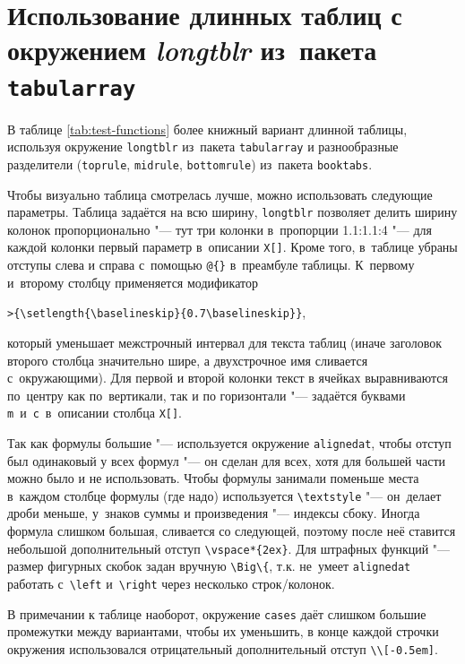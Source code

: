 \section{Использование длинных таблиц с окружением \textit{longtblr} из~пакета \texttt{tabularray}}\label{app:B2a}

В таблице \cref{tab:test-functions} более книжный вариант длинной таблицы,
используя окружение \verb!longtblr! из~пакета \verb!tabularray! и разнообразные
разделители (\verb!toprule!, \verb!midrule!, \verb!bottomrule!) из~пакета
\verb!booktabs!.

Чтобы визуально таблица смотрелась лучше, можно использовать следующие
параметры.
Таблица задаётся на всю ширину, \verb!longtblr! позволяет делить ширину колонок
пропорционально "--- тут три колонки в~пропорции 1.1:1.1:4 "--- для каждой
колонки первый параметр в~описании \verb!X[]!.
Кроме того, в~таблице убраны отступы слева и справа с~помощью \verb!@{}!
в~преамбуле таблицы.
К~первому и~второму столбцу применяется модификатор

\verb!>{\setlength{\baselineskip}{0.7\baselineskip}}!,

\noindent который уменьшает межстрочный интервал для текста таблиц (иначе
заголовок второго столбца значительно шире, а двухстрочное имя
сливается с~окружающими). Для первой и второй колонки текст в ячейках
выравниваются по~центру как по~вертикали, так и по горизонтали "---
задаётся буквами \verb!m!~и~\verb!c!~в~описании столбца \verb!X[]!.

Так как формулы большие "--- используется окружение \verb!alignedat!,
чтобы отступ был одинаковый у всех формул "--- он сделан для всех, хотя
для большей части можно было и не использовать.  Чтобы формулы
занимали поменьше места в~каждом столбце формулы (где надо)
используется \verb!\textstyle! "--- он~делает дроби меньше, у~знаков
суммы и произведения "--- индексы сбоку. Иногда формула слишком большая,
сливается со следующей, поэтому после неё ставится небольшой
дополнительный отступ \verb!\vspace*{2ex}!. Для штрафных функций "---
размер фигурных скобок задан вручную \verb!\Big\{!, т.\:к. не~умеет
\verb!alignedat! работать с~\verb!\left! и~\verb!\right! через
несколько строк/колонок.

В примечании к таблице наоборот, окружение \verb!cases! даёт слишком
большие промежутки между вариантами, чтобы их уменьшить, в конце
каждой строчки окружения использовался отрицательный дополнительный
отступ \verb!\\[-0.5em]!.

